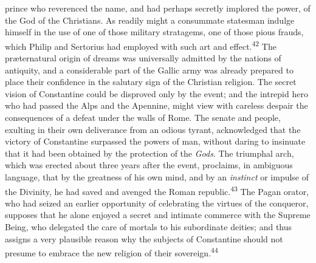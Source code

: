 prince who reverenced the name, and had perhaps secretly implored the
power, of the God of the Christians. As readily might a consummate
statesman indulge himself in the use of one of those military
stratagems, one of those pious frauds, which Philip and Sertorius had
employed with such art and effect.\textsuperscript{42} The præternatural origin of
dreams was universally admitted by the nations of antiquity, and a
considerable part of the Gallic army was already prepared to place
their confidence in the salutary sign of the Christian religion. The
secret vision of Constantine could be disproved only by the event; and
the intrepid hero who had passed the Alps and the Apennine, might view
with careless despair the consequences of a defeat under the walls of
Rome. The senate and people, exulting in their own deliverance from an
odious tyrant, acknowledged that the victory of Constantine surpassed
the powers of man, without daring to insinuate that it had been
obtained by the protection of the \textit{Gods}. The triumphal arch, which was
erected about three years after the event, proclaims, in ambiguous
language, that by the greatness of his own mind, and by an \textit{instinct}
or impulse of the Divinity, he had saved and avenged the Roman
republic.\textsuperscript{43} The Pagan orator, who had seized an earlier opportunity of
celebrating the virtues of the conqueror, supposes that he alone
enjoyed a secret and intimate commerce with the Supreme Being, who
delegated the care of mortals to his subordinate deities; and thus
assigns a very plausible reason why the subjects of Constantine should
not presume to embrace the new religion of their sovereign.\textsuperscript{44}




